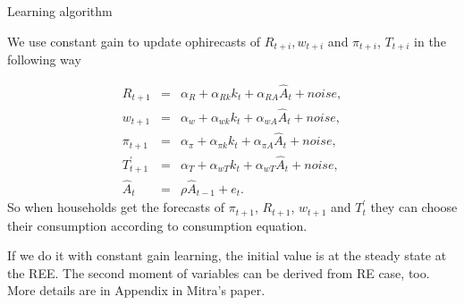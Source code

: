 \documentclass{article}
\begin{document}
\bigskip

Learning algorithm

We use constant gain to update ophirecasts of $R_{t+i},w_{t+i}$ and $\pi
_{t+i}$, $T_{t+i}$ in the following way

\begin{eqnarray}
R_{t+1} &=&\alpha _{R}+\alpha _{Rk}k_{t}+\alpha _{RA}\widehat{A}_{t}+noise,
\label{predictions} \\
w_{t+1} &=&\alpha _{w}+\alpha _{wk}k_{t}+\alpha _{wA}\widehat{A}_{t}+noise, 
\nonumber \\
\pi _{t+1} &=&\alpha _{\pi }+\alpha _{\pi k}k_{t}+\alpha _{\pi A}\widehat{A}%
_{t}+noise,  \nonumber \\
T_{t+1}^{\prime } &=&\alpha _{T}+\alpha _{wT}k_{t}+\alpha _{wT}\widehat{A}%
_{t}+noise,  \nonumber \\
\widehat{A}_{t} &=&\rho \widehat{A}_{t-1}+e_{t}.  \nonumber
\end{eqnarray}
So when households get the forecasts of $\pi _{t+1}$, $R_{t+1}$, $w_{t+1}$
and $T_{t}^{\prime }$ they can choose their consumption according to
consumption equation.

If we do it with constant gain learning, the initial value is at the steady
state at the REE. The second moment of variables can be derived from RE
case, too. More details are in Appendix in Mitra's paper.
\end{document}
